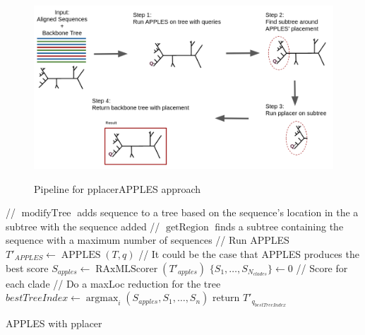 \documentclass[10pt]{article}
\begin{document}
\begin{figure}[h]
\centering
\includegraphics[width=\textwidth]{Figs/pplacerAPPLESpipeline.png}
\label{fig:pplacerAPPLES-pipeline}
\caption{Pipeline for pplacerAPPLES approach
}
\end{figure}

\begin{algorithm}[h]
\SetAlgoLined
{}
 // $\operatorname{modifyTree}$ adds sequence to a tree based on the sequence's location in the a subtree with the sequence added\;
 // $\operatorname{getRegion}$ finds a subtree containing the sequence with a maximum number of sequences\;
  // Run APPLES\;
  $T'_{APPLES} \leftarrow \operatorname{APPLES}(T, q)$\;
  // It could be the case that APPLES produces the best score\;
  $S_{apples} \leftarrow \operatorname{RAxMLScorer}( T'_{apples})$\;
  $\{S_1, \dots, S_{N_{clades}}\} \leftarrow 0$ // Score for each clade\;
 // Do a maxLoc reduction for the tree\;
 $bestTreeIndex \leftarrow \operatorname{argmax}_{i} (S_{apples},S_1,\dots,S_n)$\;
 return $T'_{q_{bestTreeIndex}}$\;
\caption{APPLES with pplacer}
 \label{alg:approach2}
\end{algorithm}
\end{document}
